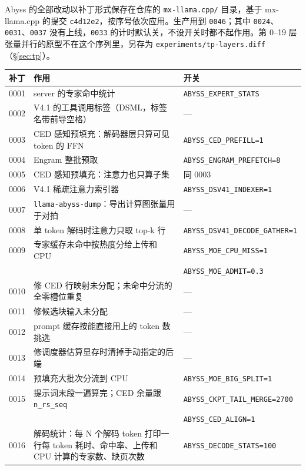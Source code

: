 \documentclass[11pt,a4paper]{article}
\newcommand{\code}[1]{\texttt{#1}}
\begin{document}
Abyss 的全部改动以补丁形式保存在仓库的 \code{mx-llama.cpp/} 目录，基于 mx-llama.cpp 的提交 \code{c4d12e2}，按序号依次应用。生产用到 \code{0046}；其中 \code{0024}、\code{0031}、\code{0037} 没有上线，\code{0033} 的计时默认关，不设开关时都不起作用。第 0--19 层张量并行的原型不在这个序列里，另存为 \code{experiments/tp-layers.diff}（\S\ref{sec:tp}）。

\begin{table}[h]
  \centering
  \small
  \begin{tabularx}{\textwidth}{@{}l X l@{}}
    \toprule
    补丁 & 作用 & 开关 \\
    \midrule
    0001 & server 的专家命中统计 & \code{ABYSS\_EXPERT\_STATS} \\
    0002 & V4.1 的工具调用标签（DSML，标签名带前导空格） & — \\
    0003 & CED 感知预填充：解码器层只算可见 token 的 FFN & \code{ABYSS\_CED\_PREFILL=1} \\
    0004 & Engram 整批预取 & \code{ABYSS\_ENGRAM\_PREFETCH=8} \\
    0005 & CED 感知预填充：注意力也只算子集 & 同 0003 \\
    0006 & V4.1 稀疏注意力索引器 & \code{ABYSS\_DSV41\_INDEXER=1} \\
    0007 & \code{llama-abyss-dump}：导出计算图张量用于对拍 & — \\
    0008 & 单 token 解码时注意力只取 top-k 行 & \code{ABYSS\_DSV41\_DECODE\_GATHER=1} \\
    0009 & 专家缓存未命中按热度分给上传和 CPU & \code{ABYSS\_MOE\_CPU\_MISS=1} \\
         & & \code{ABYSS\_MOE\_ADMIT=0.3} \\
    0010 & 修 CED 行映射未分配；未命中分流的全零槽位重复 & — \\
    0011 & 修候选块输入未分配 & — \\
    0012 & prompt 缓存按能直接用上的 token 数挑选 & — \\
    0013 & 修调度器估算显存时清掉手动指定的后端 & — \\
    0014 & 预填充大批次分流到 CPU & \code{ABYSS\_MOE\_BIG\_SPLIT=1} \\
    0015 & 提示词末段一遍算完；CED 余量跟 \code{n\_rs\_seq} & \code{ABYSS\_CKPT\_TAIL\_MERGE=2700} \\
         & & \code{ABYSS\_CED\_ALIGN=1} \\
    0016 & 解码统计：每 N 个解码 token 打印一行每 token 耗时、命中率、上传和 CPU 计算的专家数、缺页次数 & \code{ABYSS\_DECODE\_STATS=100} \\

\end{tabularx}
\end{table}
\end{document}
